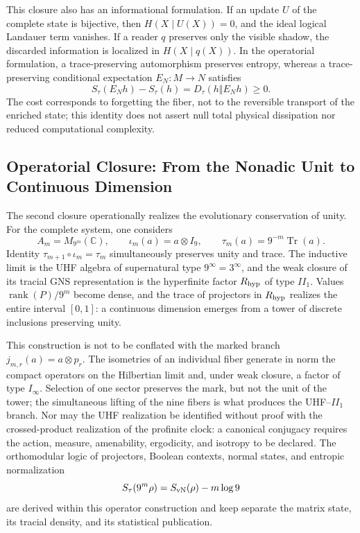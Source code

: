 This closure also has an informational formulation. If an update
\(U\) of the complete state is bijective, then
\(H(X\mid U(X))=0\), and the ideal logical Landauer term vanishes. If a
reader \(q\) preserves only the visible shadow, the discarded information is
localized in \(H(X\mid q(X))\). In the operatorial formulation, a
trace-preserving automorphism preserves entropy, whereas a trace-preserving
conditional expectation \(E_N:M\to N\) satisfies
\[
 S_\tau(E_Nh)-S_\tau(h)=D_\tau(h\Vert E_Nh)\geq0.
\]
The cost corresponds to forgetting the fiber, not to the reversible transport of the
enriched state; this identity does not assert null total physical dissipation nor
reduced computational complexity.

\subsection*{Operatorial Closure: From the Nonadic Unit to Continuous Dimension}

The second closure operationally realizes the evolutionary conservation of unity. For the complete system, one considers
\[
 A_m=M_{9^m}(\mathbb C),
 \qquad \iota_m(a)=a\otimes I_9,
 \qquad
 \tau_m(a)=9^{-m}\operatorname{Tr}(a).
\]
Identity \(\tau_{m+1}\circ\iota_m=\tau_m\) simultaneously preserves
unity and trace. The inductive limit is the UHF algebra of supernatural type
\(9^\infty=3^\infty\), and the weak closure of its tracial GNS representation is
the hyperfinite factor \(R_{\rm hyp}\) of type \(II_1\). Values
\(\operatorname{rank}(P)/9^m\) become dense, and the trace of projectors in
\(R_{\rm hyp}\) realizes the entire interval \([0,1]\): a continuous dimension
emerges from a tower of discrete inclusions preserving unity.

This construction is not to be conflated with the marked branch
\(j_{m,r}(a)=a\otimes p_r\). The isometries of an individual fiber generate in
norm the compact operators on the Hilbertian limit and, under weak closure, a
factor of type \(I_\infty\). Selection of one sector preserves the mark, but not the
unit of the tower; the simultaneous lifting of the nine fibers is what
produces the UHF--\(II_1\) branch. Nor may the UHF realization be identified
without proof with the crossed-product realization of the profinite clock: a
canonical conjugacy requires the action, measure, amenability,
ergodicity, and isotropy to be declared. The orthomodular logic of projectors, Boolean
contexts, normal states, and entropic normalization
\[
 S_\tau(9^m\rho)=S_{\rm vN}(\rho)-m\log9
\]
are derived within this operator construction and keep separate the
matrix state, its tracial density, and its statistical publication.

